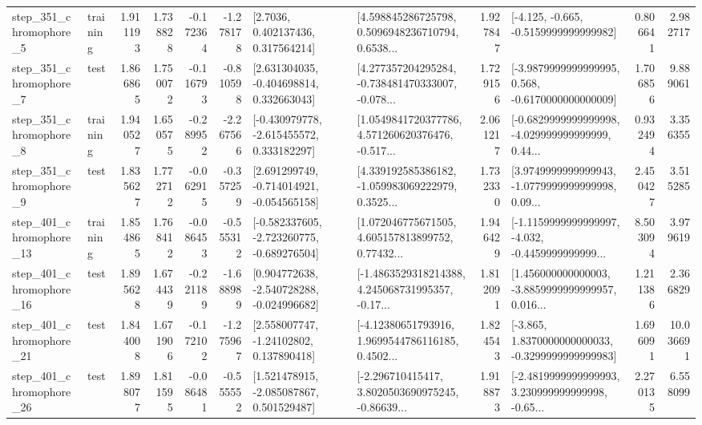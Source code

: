 \begin{tabular}{llrrrrllrlrr}
   step\_351\_chromophore\_5 &  training &      1.911193 &    1.738828 &     -0.172364 & -1.278178 &          [2.7036, 0.402137436, 0.317564214] &  [4.598845286725798, 0.5096948236710794, 0.6538... &       1.927847 &              [-4.125, -0.665, -0.5159999999999982] &            0.806641 &          2.982717 \\
   step\_351\_chromophore\_7 &      test &      1.866865 &    1.750072 &     -0.116793 & -0.810598 &    [2.631304035, -0.404698814, 0.332663043] &  [4.277357204295284, -0.738481470333007, -0.078... &       1.729156 &  [-3.9879999999999995, 0.568, -0.6170000000000009] &            1.706856 &          9.889061 \\
   step\_351\_chromophore\_8 &  training &      1.940527 &    1.650575 &     -0.289952 & -2.267566 &   [-0.430979778, -2.615455572, 0.333182297] &  [1.0549841720377786, 4.571260620376476, -0.517... &       2.061217 &  [-0.6829999999999998, -4.029999999999999, 0.44... &            0.932494 &          3.356355 \\
   step\_351\_chromophore\_9 &      test &      1.835627 &    1.772712 &     -0.062915 & -0.357259 &   [2.691299749, -0.714014921, -0.054565158] &  [4.339192585386182, -1.059983069222979, 0.3525... &       1.732330 &  [3.9749999999999943, -1.0779999999999998, 0.09... &            2.450427 &          3.515285 \\
  step\_401\_chromophore\_13 &  training &      1.854865 &    1.768412 &     -0.086453 & -0.555312 &  [-0.582337605, -2.723260775, -0.689276504] &  [1.072046775671505, 4.605157813899752, 0.77432... &       1.946429 &  [-1.1159999999999997, -4.032, -0.4459999999999... &            8.503094 &          3.979619 \\
  step\_401\_chromophore\_16 &      test &      1.895628 &    1.674439 &     -0.221189 & -1.688989 &   [0.904772638, -2.540728288, -0.024996682] &  [-1.4863529318214388, 4.245068731995357, -0.17... &       1.812091 &  [1.456000000000003, -3.8859999999999957, 0.016... &            1.211386 &          2.366829 \\
  step\_401\_chromophore\_21 &      test &      1.844008 &    1.671906 &     -0.172102 & -1.275967 &     [2.558007747, -1.24102802, 0.137890418] &  [-4.12380651793916, 1.9699544786116185, 0.4502... &       1.824543 &  [-3.865, 1.8370000000000033, -0.3299999999999983] &            1.696091 &         10.036691 \\
  step\_401\_chromophore\_26 &      test &      1.898077 &    1.811595 &     -0.086481 & -0.555552 &    [1.521478915, -2.085087867, 0.501529487] &  [-2.296710415417, 3.8020503690975245, -0.86639... &       1.918873 &  [-2.4819999999999993, 3.230999999999998, -0.65... &            2.270135 &          6.558099 \\

\end{tabular}
